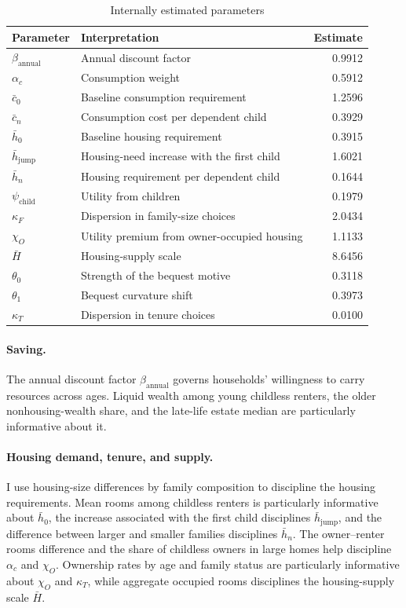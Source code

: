 \begin{table}[H]
\centering
\caption{Internally estimated parameters}
\label{tab:quant_parameters}
\small
\begin{tabularx}{0.84\textwidth}{@{}l X r@{}}
\toprule
Parameter & Interpretation & Estimate \\
\midrule
$\beta_{\mathrm{annual}}$ & Annual discount factor & 0.9912 \\
$\alpha_c$ & Consumption weight & 0.5912 \\
$\bar c_0$ & Baseline consumption requirement & 1.2596 \\
$\bar c_n$ & Consumption cost per dependent child & 0.3929 \\
$\bar h_0$ & Baseline housing requirement & 0.3915 \\
$\bar h_{\mathrm{jump}}$ & Housing-need increase with the first child & 1.6021 \\
$\bar h_n$ & Housing requirement per dependent child & 0.1644 \\
$\psi_{\mathrm{child}}$ & Utility from children & 0.1979 \\
$\kappa_F$ & Dispersion in family-size choices & 2.0434 \\
$\chi_O$ & Utility premium from owner-occupied housing & 1.1133 \\
$\bar H$ & Housing-supply scale & 8.6456 \\
$\theta_0$ & Strength of the bequest motive & 0.3118 \\
$\theta_1$ & Bequest curvature shift & 0.3973 \\
$\kappa_T$ & Dispersion in tenure choices & 0.0100 \\
\bottomrule
\end{tabularx}
\end{table}

\paragraph{Saving.}
The annual discount factor $\beta_{\mathrm{annual}}$ governs households'
willingness to carry resources across ages. Liquid wealth among young childless
renters, the older nonhousing-wealth share, and the late-life estate median are
particularly informative about it.

\paragraph{Housing demand, tenure, and supply.}
I use housing-size differences by family composition to discipline the housing
requirements. Mean rooms among childless renters is particularly informative
about $\bar h_0$, the increase associated with the first child disciplines
$\bar h_{\mathrm{jump}}$, and the difference between larger and smaller
families disciplines $\bar h_n$. The owner--renter rooms difference and the
share of childless owners in large homes help discipline $\alpha_c$ and
$\chi_O$. Ownership rates by age and family status are particularly informative
about $\chi_O$ and $\kappa_T$, while aggregate occupied rooms disciplines the
housing-supply scale $\bar H$.

